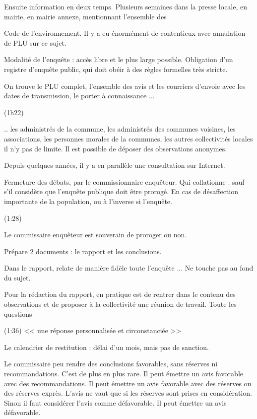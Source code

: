 		Ensuite information en deux temps. Plusieurs semaines dans la presse locale, en mairie, en mairie annexe, mentionnant l'ensemble des  
		
		Code de l'environnement. Il y a eu énormément de contentieux avec annulation de PLU sur ce sujet.
		
		Modalité de l'enquête : accès libre et le plus large possible.
		Obligation d'un registre d'enquête public, qui doit obéir à des règles formelles très stricte.
		
		On trouve le PLU complet, l'ensemble des avis et les courriers d'envoie avec les dates de transmission, le porter à connaissance ...
		
		(1h22)
		
		.. les administrés de la commune, les administrés des communes voisines, les associations, les personnes morales de la communes, les autres collectivités locales \etc il n'y pas de limite. Il est possible de déposer des observations anonymes.
		
		Depuis quelques années, il y a en parallèle une consultation sur Internet.
		
		Fermeture des débats, par le commissionnaire enquêteur. Qui collationne . sauf s'il considère que l'enquête publique doit être prorogé. En cas de désaffection importante de la population, ou à l'inverse si l'enquête.
		
		(1:28)
		
		Le commissaire enquêteur est souverain de proroger ou non.
		
		Prépare 2 documents : le rapport et les conclusions.
		
		Dans le rapport, relate de manière fidèle toute l'enquête ... \etc Ne touche pas au fond du sujet.
		
		Pour la rédaction du rapport, en pratique est de rentrer dans le contenu des observations et de proposer à la collectivité une réunion de travail. Toute les questions 
		
		(1:36) << une réponse personnalisée et circonstanciée >>
		
		
		Le calendrier de restitution : délai d'un mois, mais pas de sanction. 
		
		Le commissaire peu rendre des conclusions favorables, sans réserves ni recommandations. C'est de plus en plus rare.
		Il peut émettre un avis favorable avec des recommandations.
		Il peut émettre un avis favorable avec des réserves ou des réserves exprès. L'avis ne vaut que si les réserves sont prises en considération. Sinon il faut considérer l'avis comme défavorable.
		Il peut émettre un avis défavorable.
		
